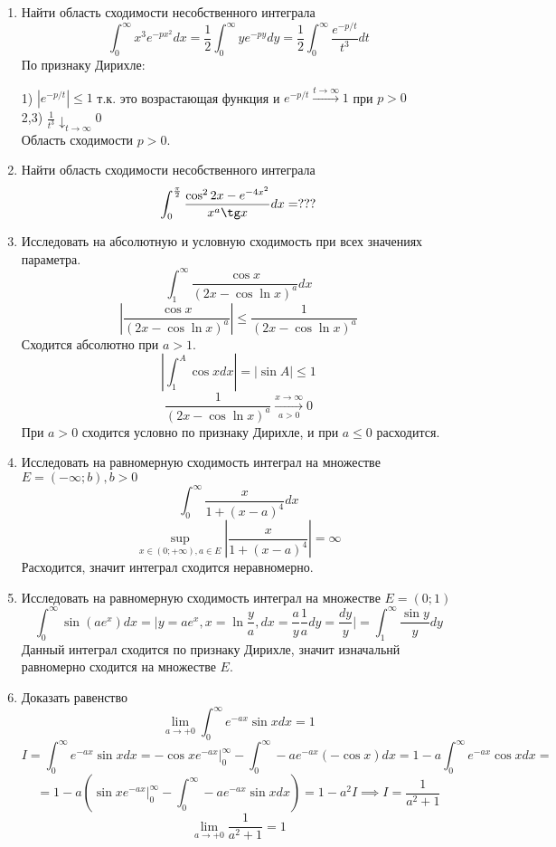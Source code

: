 \documentclass{article}
\begin{document}
\begin{large}
\begin{enumerate}
\item Найти область сходимости несобственного интеграла
$$ \int_0^\infty x^3 e^{-px^2} dx = \frac{1}{2} \int_0^\infty y e^{-py}dy = \frac{1}{2} \int_0^\infty \frac{e^{-p/t}}{t^3}dt$$
По признаку Дирихле:

1) $ \left| e^{-p/t} \right| \leq 1$ т.к. это возрастающая функция и $e^{-p/t} \xrightarrow{t \to \infty} 1$ при $p > 0$ \\
2,3) $ \frac{1}{t^3} \downarrow_{t\to\infty}0$\\
Область сходимости $p > 0$.

\item Найти область сходимости несобственного интеграла
$$ \int_0^{\frac{\pi}{2}} \frac{\cos^2 2x - e^{-4x^2}}{x^a \tg x} dx = ???$$

\item Исследовать на абсолютную и условную сходимость при всех значениях параметра.
$$ \int_1^\infty \frac{\cos x}{(2x - \cos \ln x)^a} dx $$
$$ \left| \frac{\cos x}{(2x - \cos \ln x)^a} \right| \leq \frac{1}{(2x - \cos \ln x)^a} $$
Сходится абсолютно при $a > 1$.
$$ \left| \int_1^A \cos x dx \right| = | \sin A | \leq 1 $$
$$ \frac{1}{(2x - \cos \ln x)^a} \xrightarrow[a>0]{x\to\infty} 0 $$
При $a > 0$ сходится условно по признаку Дирихле, и при $a \leq 0$ расходится.

\item Исследовать на равномерную сходимость интеграл на множестве $ E = (-\infty; b), b>0$
$$ \int_0^\infty \frac{x}{1 + (x - a)^4} dx $$
$$ \sup_{x\in (0;+\infty), a \in E} \left| \frac{x}{1 + (x - a)^4} \right| = \infty $$
Расходится, значит интеграл сходится неравномерно.

\item Исследовать на равномерную сходимость интеграл на множестве $ E = (0; 1)$
$$ \int_0^\infty \sin (ae^x) dx = \Big| y = ae^x, x = \ln \frac{y}{a}, dx = \frac{a}{y} \frac{1}{a} dy = \frac{dy}{y} \Big| = \int_1^\infty \frac{\sin y}{y} dy $$
Данный интеграл сходится по признаку Дирихле, значит изначальнй равномерно сходится на множестве $E$.

\item Доказать равенство
$$ \lim_{a \to +0} \int_0^\infty e^{-ax} \sin x dx = 1 $$
$$ I = \int_0^\infty e^{-ax} \sin x dx = -\cos x e^{-ax} \Big|_0^\infty - \int_0^\infty -a e^{-ax} (-\cos x) dx = 1 - a\int_0^\infty e^{-ax} \cos x dx = $$
$$ = 1 - a \left(\sin x e^{-ax} \Big|_0^\infty - \int_0^\infty -a e^{-ax} \sin x dx \right) = 1 - a^2 I \implies I = \frac{1}{a^2 + 1}  $$
$$ \lim_{a \to +0} \frac{1}{a^2+1} = 1 $$


\end{enumerate}
\end{large}
\end{document}
